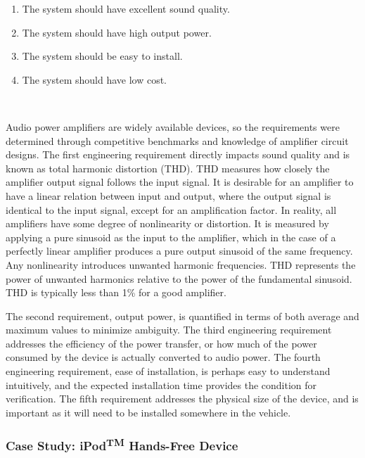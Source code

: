 \begin{longtable}[]
{\begin{minipage}[t]{\linewidth}
\begin{enumerate}
\def\labelenumi{\arabic{enumi}.}
\item
  The system should have excellent sound quality.
\item
  The system should have high output power.
\item
  The system should be easy to install.
\item
  The system should have low cost.
\end{enumerate}
\end{minipage}} \\
\end{longtable}

Audio power amplifiers are widely available devices, so the requirements
were determined through competitive benchmarks and knowledge of
amplifier circuit designs. The first engineering requirement directly
impacts sound quality and is known as total harmonic distortion (THD).
THD measures how closely the amplifier output signal follows the input
signal. It is desirable for an amplifier to have a linear relation
between input and output, where the output signal is identical to the
input signal, except for an amplification factor. In reality, all
amplifiers have some degree of nonlinearity or distortion. It is
measured by applying a pure sinusoid as the input to the amplifier,
which in the case of a perfectly linear amplifier produces a pure output
sinusoid of the same frequency. Any nonlinearity introduces unwanted
harmonic frequencies. THD represents the power of unwanted harmonics
relative to the power of the fundamental sinusoid. THD is typically less
than 1\% for a good amplifier.

The second requirement, output power, is quantified in terms of both
average and maximum values to minimize ambiguity. The third engineering
requirement addresses the efficiency of the power transfer, or how much
of the power consumed by the device is actually converted to audio
power. The fourth engineering requirement, ease of installation, is
perhaps easy to understand intuitively, and the expected installation
time provides the condition for verification. The fifth requirement
addresses the physical size of the device, and is important as it will
need to be installed somewhere in the vehicle.

\subsubsection{\texorpdfstring{Case Study: iPod\textsuperscript{TM}
Hands-Free
Device}{Case Study: iPodTM Hands-Free Device}}\label{case-study-ipodtm-hands-free-device}

